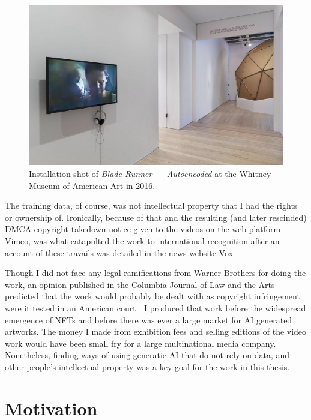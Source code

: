 \begin{figure}[!htb]
    \centering
    \captionsetup{justification=centering}
    \includegraphics[width=1\textwidth]{figures/c1_intro/whitney-installation-shot.png}
    \caption{Installation shot of \textit{Blade Runner --- Autoencoded} at the Whitney Museum of American Art in 2016.}
    \label{fig:c1:blade-runner-whitney}
\end{figure}

The training data, of course, was not intellectual property that I had the rights or ownership of. 
Ironically, because of that and the resulting (and later rescinded) DMCA copyright takedown notice given to the videos on the web platform Vimeo, was what catapulted the work to international recognition after an account of these travails was detailed in the news website Vox \citep{romano2016bladerunner}.

Though I did not face any legal ramifications from Warner Brothers for doing the work, an opinion published in the Columbia Journal of Law and the Arts predicted that the work would probably be dealt with as copyright infringement were it tested in an American court \citep{sobel2017artificial}. 
I produced that work before the widespread emergence of NFTs and before there was ever a large market for AI generated artworks. 
The money I made from exhibition fees and selling editions of the video work would have been small fry for a large multinational media company. 
Nonetheless, finding ways of using generatie AI that do not rely on data, and other people's intellectual property was a key goal for the work in this thesis.

\section{Motivation}

